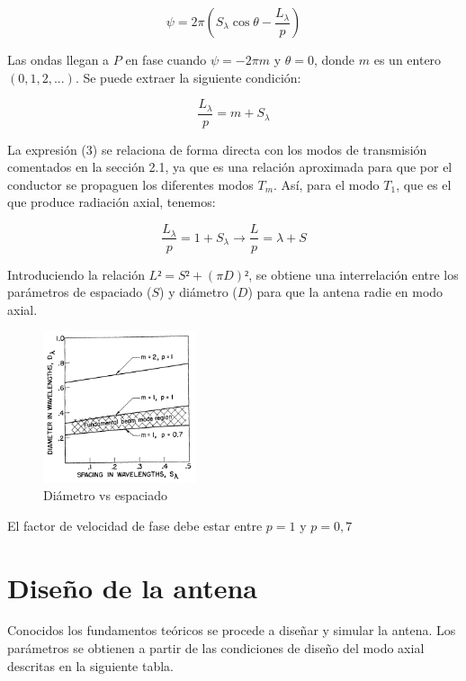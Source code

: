 \documentclass[12pt]{article}
\begin{document}
\begin{equation}
	\psi=2\pi(S_{\lambda}\cos\theta-\frac{L_{\lambda}}{p})
\end{equation} 

Las ondas llegan a $P$ en fase cuando $\psi=-2\pi m$ y $\theta=0$, donde $m$ es un entero $(0,1,2,...)$. Se puede extraer la siguiente condición:

\begin{equation}
	\frac{L_{\lambda}}{p}=m+S_{\lambda}
\end{equation} 

La expresión (3) se relaciona de forma directa con los modos de transmisión comentados en la sección 2.1, ya que es una relación aproximada para que por el conductor se propaguen los diferentes modos $T_{m}$. Así, para el modo $T_{1}$, que es el que produce radiación axial, tenemos:

\begin{equation}
	\frac{L_{\lambda}}{p}=1+S_{\lambda}\longrightarrow\frac{L}{p}=\lambda+S
\end{equation} 

Introduciendo la relación $L²=S²+(\pi D)²$, se obtiene una interrelación entre los parámetros de espaciado ($S$) y diámetro ($D$) para que la antena radie en modo axial.\\

\begin{figure}[!h]
	\centering
	\includegraphics[width=0.4\textwidth]{diametro_espaciado.png}
	\caption{Diámetro vs espaciado}
	\label{fig:diam_vs_spacing}
\end{figure}

El factor de velocidad de fase debe estar entre $p=1$ y $p=0,7$ 
\newpage

\section{Diseño de la antena}
Conocidos los fundamentos teóricos se procede a diseñar y simular la antena. Los parámetros se obtienen a partir de las condiciones de diseño del modo axial descritas en la siguiente tabla.
\end{document}
